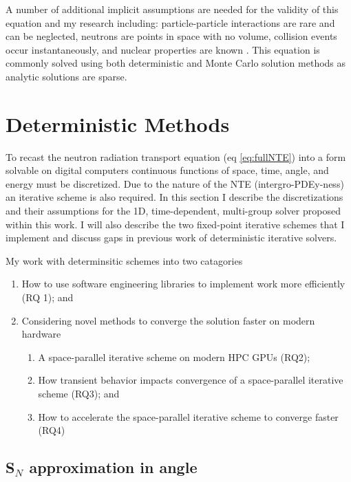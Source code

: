 A number of additional implicit assumptions are needed for the validity of this equation and my research including: particle-particle interactions are rare and can be neglected, neutrons are points in space with no volume, collision events occur instantaneously, and nuclear properties are known \cite{lewis_computational_1984}.
This equation is commonly solved using both deterministic and Monte Carlo solution methods as analytic solutions are sparse.

\section{Deterministic Methods}

To recast the neutron radiation transport equation (eq \ref{eq:fullNTE}) into a form solvable on digital computers continuous functions of space, time, angle, and energy must be discretized.
Due to the nature of the NTE (intergro-PDEy-ness) an iterative scheme is also required.
In this section I describe the discretizations and their assumptions for the 1D, time-dependent, multi-group solver proposed within this work.
I will also describe the two fixed-point iterative schemes that I implement and discuss gaps in previous work of deterministic iterative solvers.

My work with determinsitic schemes into two catagories
\begin{enumerate}
    \item How to use software engineering libraries to implement work more efficiently (RQ 1); and
    \item Considering novel methods to converge the solution faster on modern hardware
    \begin{enumerate}
        \item A space-parallel iterative scheme on modern HPC GPUs (RQ2);
        \item How transient behavior impacts convergence of a space-parallel iterative scheme (RQ3); and
        \item How to accelerate the space-parallel iterative scheme to converge faster (RQ4)
    \end{enumerate}
\end{enumerate}

\subsection{S$_N$ approximation in angle}

